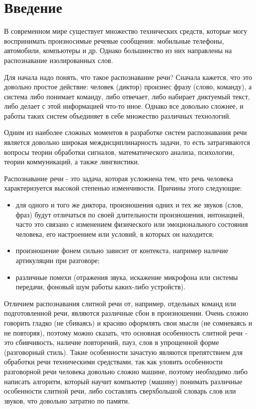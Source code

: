 \chapter*{Введение}
\setcounter{page}{2}

В современном мире существует множество технических средств, которые могу воспринимать произносимые речевые сообщения: мобильные телефоны, автомобили, компьютеры и др. Однако большинство из них направлены на распознавание изолированных слов. 

Для начала надо понять, что такое распознавание речи? Сначала кажется, что это довольно простое действие: человек (диктор) произнес фразу (слово, команду), а система либо понимает команду, либо отвечает, либо набирает диктуемый текст, либо делает с этой информацией что-то иное. Однако все довольно сложнее, и работы таких систем объединяет в себе множество различных технологий.

Одним из наиболее сложных моментов в разработке систем распознавания речи является довольно широкая междисциплинарность задачи, то есть затрагиваются вопросы теории обработки сигналов, математического анализа, психологии, теории коммуникаций, а также лингвистики.
 
Распознавание речи - это задача, которая усложнена тем, что речь человека характеризуется высокой степенью изменчивости. Причины этого следующие:
\begin{itemize}
	\item для одного и того же диктора, произношения одних и тех же звуков (слов, фраз) будут отличаться по своей длительности произношения, интонацией, часто это связано с изменением физического или эмоционального состояния человека, его настроением или условий, в которых он находится;
	\item произношение фонем сильно зависит от контекста, например наличие артикуляции при разговоре;
	\item различные помехи (отражения звука, искажение микрофона или системы передачи, фоновый шум работы каких-либо устройств).
\end{itemize}

Отличием распознавания слитной речи от, например, отдельных команд или подготовленной речи, являются различные сбои в произношении. Очень сложно говорить гладко (не сбиваясь) и красиво оформлять свои мысли (не сомневаясь и не повторяя), поэтому можно сказать, что основная особенность слитной речи - это сбивчивость, наличие повторений, пауз, слов в упрощенной форме (разговорный стиль). Такие особенности зачастую являются препятствием для обработки речи техническими средствами, так как уловить особенности разговорной речи человека довольно сложно машине, поэтому необходимо либо написать алгоритм, который научит компьютер (машину) понимать различные особенности слитной речи, либо составлять сверхбольшой словарь слов или звуков, что довольно затратно по памяти.

